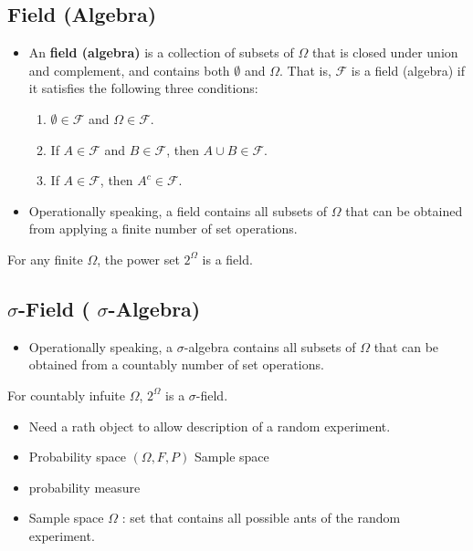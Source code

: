 \subsection{Field (Algebra)}
\begin{itemize}
\item An \textbf{field (algebra)} is a collection of subsets of
  \(\Omega\) that is closed under union and complement, and contains
  both \(\emptyset\) and \(\Omega\). That is, \(\mathcal{F}\) is a
  field (algebra) if it satisfies the following three conditions:
\begin{enumerate}
\item \(\emptyset \in \mathcal{F}\) and \(\Omega \in \mathcal{F}\).
\item If \(A \in \mathcal{F}\) and \(B \in \mathcal{F}\), then \(A \cup B \in \mathcal{F}\). 
\item If \(A \in \mathcal{F}\), then \(A^{c} \in \mathcal{F}\).
\end{enumerate}
  
\item Operationally speaking, a field contains all subsets of
  \(\Omega\) that can be obtained from applying a finite number of set
  operations.
\end{itemize}

\begin{fact}
 For any finite \(\Omega\), the power set \(2^{\Omega}\) is a field.
\end{fact}

\subsection{\(\sigma\)-Field ( \(\sigma\)-Algebra)}
\begin{itemize}
A field \(\mathcal{F}\) is a \(\sigma\)-field if it satisfies the additional condition:
\begin{enumerate}
\item If \(A_{1}, A_{2}, \ldots \in \mathcal{F}\), then \(\bigcup_{i=1}^{\infty} A_{i} \in \mathcal{F}\).
\end{enumerate}
\newcommand{\theenumi}{\roman{enumi}}
\setcounter{enumi}{2}
\item Operationally speaking, a \(\sigma\)-algebra contains all
  subsets of \(\Omega\) that can be obtained from a countably number
  of set operations.
\end{itemize}
\begin{fact}
For countably infuite \(\Omega\), \(2^{\Omega}\) is a \(\sigma\)-field.
\end{fact} 


\begin{itemize}
  \item[-] Need a rath object to allow description of a random experiment.
  \item[-] Probability space \((\Omega, F, P)\) Sample space
  \item[] probability measure
  \item[-] Sample space \(\Omega\) : set that contains all possible ants of the random experiment.
\end{itemize}
